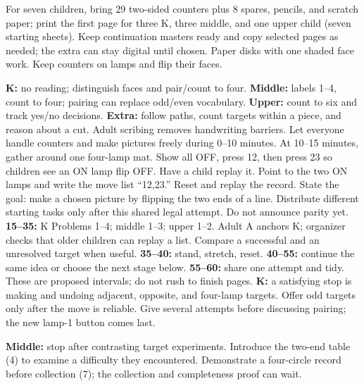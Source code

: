 \documentclass[12pt]{extarticle}
\begin{document}
For seven children, bring 29 two-sided counters plus 8 spares, pencils, and scratch paper; print the first page for three K, three middle, and one upper child (seven starting sheets). Keep continuation masters ready and copy selected pages as needed; the extra can stay digital until chosen. Paper disks with one shaded face work. Keep counters on lamps and flip their faces.\par
\textbf{K:} no reading; distinguish faces and pair/count to four. \textbf{Middle:} labels 1--4, count to four; pairing can replace odd/even vocabulary. \textbf{Upper:} count to six and track yes/no decisions. \textbf{Extra:} follow paths, count targets within a piece, and reason about a cut. Adult scribing removes handwriting barriers.
Let everyone handle counters and make pictures freely during 0--10 minutes. At 10--15 minutes, gather around one four-lamp mat. Show all OFF, press 12, then press 23 so children see an ON lamp flip OFF. Have a child replay it. Point to the two ON lamps and write the move list ``12,23.'' Reset and replay the record. State the goal: make a chosen picture by flipping the two ends of a line. Distribute different starting tasks only after this shared legal attempt. Do not announce parity yet.
\textbf{15--35:} K Problems 1--4; middle 1--3; upper 1--2. Adult A anchors K; organizer checks that older children can replay a list. Compare a successful and an unresolved target when useful. \textbf{35--40:} stand, stretch, reset. \textbf{40--55:} continue the same idea or choose the next stage below. \textbf{55--60:} share one attempt and tidy. These are proposed intervals; do not rush to finish pages.
\textbf{K:} a satisfying stop is making and undoing adjacent, opposite, and four-lamp targets. Offer odd targets only after the move is reliable. Give several attempts before discussing pairing; the new lamp-1 button comes last.\par
\textbf{Middle:} stop after contrasting target experiments. Introduce the two-end table (4) to examine a difficulty they encountered. Demonstrate a four-circle record before collection (7); the collection and completeness proof can wait.\par
\end{document}
